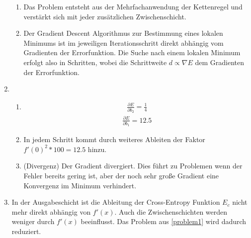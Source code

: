 \documentclass{article}
\begin{document}
\begin{enumerate}
\begin{enumerate}[label=\alph*)]
          \item Das Problem entsteht aus der Mehrfachanwendung der Kettenregel und verstärkt sich mit jeder zusätzlichen Zwischenschicht.
          \item Der Gradient Descent Algorithmus zur Bestimmung eines lokalen Minimums ist im jeweiligen Iterationsschritt direkt abhängig vom Gradienten der Errorfunktion. Die Suche nach einem lokalen Minimum erfolgt also in Schritten, wobei die Schrittweite $d \propto \nabla E$ dem Gradienten der Errorfunktion.
        \end{enumerate}
  \item
        \begin{enumerate}[label=\alph*)]
          \item
                \begin{align*}
                  \frac{\partial E}{\partial b_2} = \frac{1}{4}
                \end{align*}
                \begin{align*}
                  \frac{\partial E}{\partial b_1} = 12.5
                \end{align*}
                \item \label{problem1}%
                In jedem Schritt kommt durch weiteres Ableiten der Faktor $f'(0)^2*100=12.5$ hinzu.
          \item (Divergenz)
                Der Gradient divergiert. Dies führt zu Problemen wenn der Fehler bereits gering ist, aber der noch sehr große Gradient eine Konvergenz im Minimum verhindert.
        \end{enumerate}
  \item In der Ausgabeschicht ist die Ableitung der Cross-Entropy Funktion $E_c$ nicht mehr direkt abhängig von $f'(x)$. Auch die Zwischenschichten werden weniger durch $f'(x)$ beeinflusst. Das Problem aus \ref{problem1} wird dadurch reduziert.
\end{enumerate}
\end{document}
